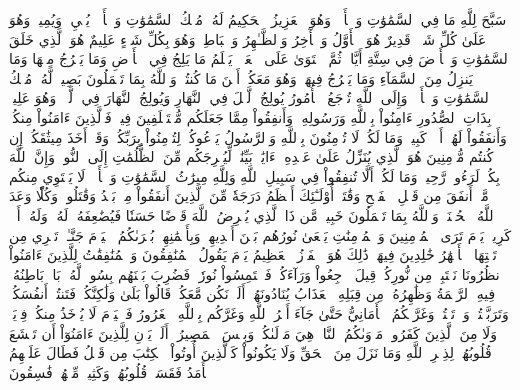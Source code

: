 سَبَّحَ لِلَّهِ مَا فِي ٱلسَّمَٰوَٰتِ وَٱلۡأَرۡضِۖ وَهُوَ ٱلۡعَزِيزُ ٱلۡحَكِيمُ
لَهُۥ مُلۡكُ ٱلسَّمَٰوَٰتِ وَٱلۡأَرۡضِۖ يُحۡيِۦ وَيُمِيتُۖ وَهُوَ عَلَىٰ كُلِّ شَيۡءٖ قَدِيرٌ
هُوَ ٱلۡأَوَّلُ وَٱلۡأٓخِرُ وَٱلظَّـٰهِرُ وَٱلۡبَاطِنُۖ وَهُوَ بِكُلِّ شَيۡءٍ عَلِيمٌ
هُوَ ٱلَّذِي خَلَقَ ٱلسَّمَٰوَٰتِ وَٱلۡأَرۡضَ فِي سِتَّةِ أَيَّامٖ ثُمَّ ٱسۡتَوَىٰ عَلَى ٱلۡعَرۡشِۖ يَعۡلَمُ مَا يَلِجُ فِي ٱلۡأَرۡضِ وَمَا يَخۡرُجُ مِنۡهَا وَمَا يَنزِلُ مِنَ ٱلسَّمَآءِ وَمَا يَعۡرُجُ فِيهَاۖ وَهُوَ مَعَكُمۡ أَيۡنَ مَا كُنتُمۡۚ وَٱللَّهُ بِمَا تَعۡمَلُونَ بَصِيرٞ
لَّهُۥ مُلۡكُ ٱلسَّمَٰوَٰتِ وَٱلۡأَرۡضِۚ وَإِلَى ٱللَّهِ تُرۡجَعُ ٱلۡأُمُورُ
يُولِجُ ٱلَّيۡلَ فِي ٱلنَّهَارِ وَيُولِجُ ٱلنَّهَارَ فِي ٱلَّيۡلِۚ وَهُوَ عَلِيمُۢ بِذَاتِ ٱلصُّدُورِ
ءَامِنُواْ بِٱللَّهِ وَرَسُولِهِۦ وَأَنفِقُواْ مِمَّا جَعَلَكُم مُّسۡتَخۡلَفِينَ فِيهِۖ فَٱلَّذِينَ ءَامَنُواْ مِنكُمۡ وَأَنفَقُواْ لَهُمۡ أَجۡرٞ كَبِيرٞ
وَمَا لَكُمۡ لَا تُؤۡمِنُونَ بِٱللَّهِ وَٱلرَّسُولُ يَدۡعُوكُمۡ لِتُؤۡمِنُواْ بِرَبِّكُمۡ وَقَدۡ أَخَذَ مِيثَٰقَكُمۡ إِن كُنتُم مُّؤۡمِنِينَ
هُوَ ٱلَّذِي يُنَزِّلُ عَلَىٰ عَبۡدِهِۦٓ ءَايَٰتِۭ بَيِّنَٰتٖ لِّيُخۡرِجَكُم مِّنَ ٱلظُّلُمَٰتِ إِلَى ٱلنُّورِۚ وَإِنَّ ٱللَّهَ بِكُمۡ لَرَءُوفٞ رَّحِيمٞ
وَمَا لَكُمۡ أَلَّا تُنفِقُواْ فِي سَبِيلِ ٱللَّهِ وَلِلَّهِ مِيرَٰثُ ٱلسَّمَٰوَٰتِ وَٱلۡأَرۡضِۚ لَا يَسۡتَوِي مِنكُم مَّنۡ أَنفَقَ مِن قَبۡلِ ٱلۡفَتۡحِ وَقَٰتَلَۚ أُوْلَـٰٓئِكَ أَعۡظَمُ دَرَجَةٗ مِّنَ ٱلَّذِينَ أَنفَقُواْ مِنۢ بَعۡدُ وَقَٰتَلُواْۚ وَكُلّٗا وَعَدَ ٱللَّهُ ٱلۡحُسۡنَىٰۚ وَٱللَّهُ بِمَا تَعۡمَلُونَ خَبِيرٞ
مَّن ذَا ٱلَّذِي يُقۡرِضُ ٱللَّهَ قَرۡضًا حَسَنٗا فَيُضَٰعِفَهُۥ لَهُۥ وَلَهُۥٓ أَجۡرٞ كَرِيمٞ
يَوۡمَ تَرَى ٱلۡمُؤۡمِنِينَ وَٱلۡمُؤۡمِنَٰتِ يَسۡعَىٰ نُورُهُم بَيۡنَ أَيۡدِيهِمۡ وَبِأَيۡمَٰنِهِمۖ بُشۡرَىٰكُمُ ٱلۡيَوۡمَ جَنَّـٰتٞ تَجۡرِي مِن تَحۡتِهَا ٱلۡأَنۡهَٰرُ خَٰلِدِينَ فِيهَاۚ ذَٰلِكَ هُوَ ٱلۡفَوۡزُ ٱلۡعَظِيمُ
يَوۡمَ يَقُولُ ٱلۡمُنَٰفِقُونَ وَٱلۡمُنَٰفِقَٰتُ لِلَّذِينَ ءَامَنُواْ ٱنظُرُونَا نَقۡتَبِسۡ مِن نُّورِكُمۡ قِيلَ ٱرۡجِعُواْ وَرَآءَكُمۡ فَٱلۡتَمِسُواْ نُورٗاۖ فَضُرِبَ بَيۡنَهُم بِسُورٖ لَّهُۥ بَابُۢ بَاطِنُهُۥ فِيهِ ٱلرَّحۡمَةُ وَظَٰهِرُهُۥ مِن قِبَلِهِ ٱلۡعَذَابُ
يُنَادُونَهُمۡ أَلَمۡ نَكُن مَّعَكُمۡۖ قَالُواْ بَلَىٰ وَلَٰكِنَّكُمۡ فَتَنتُمۡ أَنفُسَكُمۡ وَتَرَبَّصۡتُمۡ وَٱرۡتَبۡتُمۡ وَغَرَّتۡكُمُ ٱلۡأَمَانِيُّ حَتَّىٰ جَآءَ أَمۡرُ ٱللَّهِ وَغَرَّكُم بِٱللَّهِ ٱلۡغَرُورُ
فَٱلۡيَوۡمَ لَا يُؤۡخَذُ مِنكُمۡ فِدۡيَةٞ وَلَا مِنَ ٱلَّذِينَ كَفَرُواْۚ مَأۡوَىٰكُمُ ٱلنَّارُۖ هِيَ مَوۡلَىٰكُمۡۖ وَبِئۡسَ ٱلۡمَصِيرُ
۞أَلَمۡ يَأۡنِ لِلَّذِينَ ءَامَنُوٓاْ أَن تَخۡشَعَ قُلُوبُهُمۡ لِذِكۡرِ ٱللَّهِ وَمَا نَزَلَ مِنَ ٱلۡحَقِّ وَلَا يَكُونُواْ كَٱلَّذِينَ أُوتُواْ ٱلۡكِتَٰبَ مِن قَبۡلُ فَطَالَ عَلَيۡهِمُ ٱلۡأَمَدُ فَقَسَتۡ قُلُوبُهُمۡۖ وَكَثِيرٞ مِّنۡهُمۡ فَٰسِقُونَ
